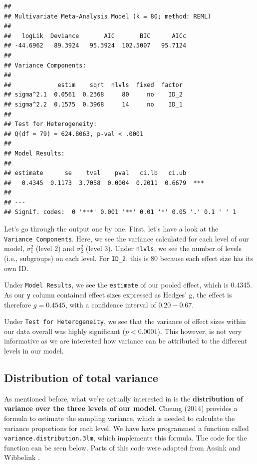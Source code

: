 \documentclass[]{book}
\begin{document}
\begin{verbatim}
## 
## Multivariate Meta-Analysis Model (k = 80; method: REML)
## 
##   logLik  Deviance       AIC       BIC      AICc  
## -44.6962   89.3924   95.3924  102.5007   95.7124  
## 
## Variance Components: 
## 
##             estim    sqrt  nlvls  fixed  factor
## sigma^2.1  0.0561  0.2368     80     no    ID_2
## sigma^2.2  0.1575  0.3968     14     no    ID_1
## 
## Test for Heterogeneity: 
## Q(df = 79) = 624.8063, p-val < .0001
## 
## Model Results:
## 
## estimate      se    tval    pval   ci.lb   ci.ub     
##   0.4345  0.1173  3.7058  0.0004  0.2011  0.6679  ***
## 
## ---
## Signif. codes:  0 '***' 0.001 '**' 0.01 '*' 0.05 '.' 0.1 ' ' 1
\end{verbatim}

Let's go through the output one by one. First, let's have a look at the \texttt{Variance\ Components}. Here, we see the variance calculated for each level of our model, \(\sigma^2_1\) (level 2) and \(\sigma^2_2\) (level 3). Under \texttt{nlvls}, we see the number of levels (i.e., subgroups) on each level. For \texttt{ID\_2}, this is 80 because each effect size has its own ID.

Under \texttt{Model\ Results}, we see the \texttt{estimate} of our pooled effect, which is 0.4345. As our \texttt{y} column contained effect sizes expressed as Hedges' g, the effect is therefore \(g = 0.4545\), with a confidence interval of \(0.20-0.67\).

Under \texttt{Test\ for\ Heterogeneity}, we see that the variance of effect sizes within our data overall was highly significant (\(p < 0.0001\)). This however, is not very informative as we are interested how variance can be attributed to the different levels in our model.

\hypertarget{distribution-of-total-variance}{%
\subsection{Distribution of total variance}\label{distribution-of-total-variance}}

As mentioned before, what we're actually interested in is the \textbf{distribution of variance over the three levels of our model}. Cheung (2014) provides a formula to estimate the sampling variance, which is needed to calculate the variance proportions for each level. We have have programmed a function called \texttt{variance.distribution.3lm}, which implements this formula. The code for the function can be seen below. Parts of this code were adapted from Assink and Wibbelink \citep{assink2016fitting}.
\end{document}
